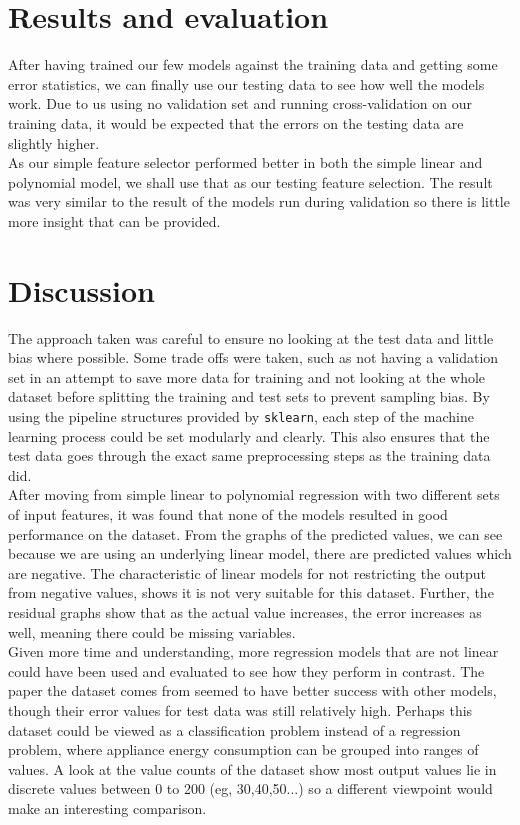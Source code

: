 \documentclass{article}
\newcommand{\n}[0]{\\[\baselineskip]}
\begin{document}
\section{Results and evaluation}
After having trained our few models against the training data and getting some error statistics, we can finally use our testing data to see how well the models work. Due to us using no validation set and running cross-validation on our training data, it would be expected that the errors on the testing data are slightly higher. 
\n
As our simple feature selector performed better in both the simple linear and polynomial model, we shall use that as our testing feature selection. The result was very similar to the result of the models run during validation so there is little more insight that can be provided. 


\section{Discussion}
The approach taken was careful to ensure no looking at the test data and little bias where possible. Some trade offs were taken, such as not having a validation set in an attempt to save more data for training and not looking at the whole dataset before splitting the training and test sets to prevent sampling bias. By using the pipeline structures provided by \texttt{sklearn}, each step of the machine learning process could be set modularly and clearly. This also ensures that the test data goes through the exact same preprocessing steps as the training data did.
\n
After moving from simple linear to polynomial regression with two different sets of input features, it was found that none of the models resulted in good performance on the dataset. From the graphs of the predicted values, we can see because we are using an underlying linear model, there are predicted values which are negative. The characteristic of linear models for not restricting the output from negative values, shows it is not very suitable for this dataset. Further, the residual graphs show that as the actual value increases, the error increases as well, meaning there could be missing variables. 
\n
Given more time and understanding, more regression models that are not linear could have been used and evaluated to see how they perform in contrast. The paper the dataset comes from seemed to have better success with other models, though their error values for test data was still relatively high. Perhaps this dataset could be viewed as a classification problem instead of a regression problem, where appliance energy consumption can be grouped into ranges of values. A look at the value counts of the dataset show most output values lie in discrete values between 0 to 200 (eg, 30,40,50...) so a different viewpoint would make an interesting comparison.


\printbibliography
\end{document}
